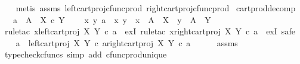 \begin{isabellebody}
%
\isadelimproof
\ \ %
\endisadelimproof
%
\isatagproof
{}\isamarkupfalse%
\ {\isacharparenleft}{\kern0pt}metis\ assms\ left{\isacharunderscore}{\kern0pt}cart{\isacharunderscore}{\kern0pt}proj{\isacharunderscore}{\kern0pt}cfunc{\isacharunderscore}{\kern0pt}prod\ right{\isacharunderscore}{\kern0pt}cart{\isacharunderscore}{\kern0pt}proj{\isacharunderscore}{\kern0pt}cfunc{\isacharunderscore}{\kern0pt}prod{\isacharparenright}{\kern0pt}%
\endisatagproof
{\isafoldproof}%
%
\isadelimproof
\isanewline
%
\endisadelimproof
\isanewline
{}\isamarkupfalse%
\ cart{\isacharunderscore}{\kern0pt}prod{\isacharunderscore}{\kern0pt}decomp{\isacharcolon}{\kern0pt}\isanewline
\ \ \ {\isachardoublequoteopen}a\ {\isacharcolon}{\kern0pt}\ A\ {\isasymrightarrow}\ X\ {\isasymtimes}\isactrlsub c\ Y{\isachardoublequoteclose}\isanewline
\ \ \ {\isachardoublequoteopen}{\isasymexists}\ x\ y{\isachardot}{\kern0pt}\ a\ {\isacharequal}{\kern0pt}\ {\isasymlangle}x{\isacharcomma}{\kern0pt}\ y{\isasymrangle}\ {\isasymand}\ x\ {\isacharcolon}{\kern0pt}\ A\ {\isasymrightarrow}\ X\ {\isasymand}\ y\ {\isacharcolon}{\kern0pt}\ A\ {\isasymrightarrow}\ Y{\isachardoublequoteclose}\isanewline
%
\isadelimproof
%
\endisadelimproof
%
\isatagproof
{}\isamarkupfalse%
\ {\isacharparenleft}{\kern0pt}rule{\isacharunderscore}{\kern0pt}tac\ x{\isacharequal}{\kern0pt}{\isachardoublequoteopen}left{\isacharunderscore}{\kern0pt}cart{\isacharunderscore}{\kern0pt}proj\ X\ Y\ {\isasymcirc}\isactrlsub c\ a{\isachardoublequoteclose}\ \ exI{\isacharcomma}{\kern0pt}\ rule{\isacharunderscore}{\kern0pt}tac\ x{\isacharequal}{\kern0pt}{\isachardoublequoteopen}right{\isacharunderscore}{\kern0pt}cart{\isacharunderscore}{\kern0pt}proj\ X\ Y\ {\isasymcirc}\isactrlsub c\ a{\isachardoublequoteclose}\ \ exI{\isacharcomma}{\kern0pt}\ safe{\isacharparenright}{\kern0pt}\isanewline
\ \ \isamarkupfalse%
\ {\isachardoublequoteopen}a\ {\isacharequal}{\kern0pt}\ {\isasymlangle}left{\isacharunderscore}{\kern0pt}cart{\isacharunderscore}{\kern0pt}proj\ X\ Y\ {\isasymcirc}\isactrlsub c\ a{\isacharcomma}{\kern0pt}right{\isacharunderscore}{\kern0pt}cart{\isacharunderscore}{\kern0pt}proj\ X\ Y\ {\isasymcirc}\isactrlsub c\ a{\isasymrangle}{\isachardoublequoteclose}\isanewline
\ \ \ \ \isamarkupfalse%
\ assms\ \isamarkupfalse%
\ {\isacharparenleft}{\kern0pt}typecheck{\isacharunderscore}{\kern0pt}cfuncs{\isacharcomma}{\kern0pt}\ simp\ add{\isacharcolon}{\kern0pt}\ cfunc{\isacharunderscore}{\kern0pt}prod{\isacharunderscore}{\kern0pt}unique{\isacharparenright}{\kern0pt}\isanewline

\end{isabellebody}

